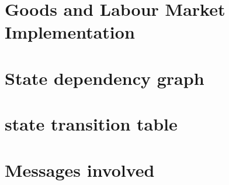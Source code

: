 \section{Goods and Labour Market Implementation}

\section{State dependency graph}
\section{state transition table}
\section{Messages involved}